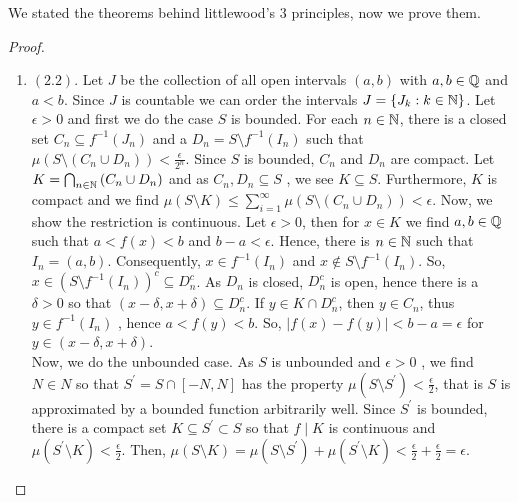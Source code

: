 \begin{recall}
	We stated the theorems behind littlewood's \(3\) principles, now we prove them.
\end{recall}
\begin{proof}
	\begin{enumerate}
		\item \(\left( 2.2 \right) \). Let \(J\) be the collection of all open intervals \(\left( a, b \right) \) with \(a, b \in \mathbb{Q}\)  and \(a < b\). Since \(J\) is countable we can order the intervals \(J = \{J_{k} : k \in \mathbb{N}\} \). Let \(\epsilon > 0\) and first we do the case \(S\) is bounded. For each \(n \in \mathbb{N}\), there is a closed set \(C_{n} \subseteq f^{-1}\left( J_{n} \right) \) and a \(D_{n} = S \setminus f^{-1}\left( I_{n} \right) \) such that \( \mu\left( S \setminus \left( C_{n} \cup D_{n} \right)  \right) < \frac{\epsilon}{2^{n}} \). Since \(S\) is bounded, \(C_{n}\)  and \(D_{n}\) are compact. Let \(K = \bigcap_{n\in \mathbb{N}}\left( C_{n} \cup D_{n} \right)  \) and as \(C_{n}, D_{n} \subseteq S\) , we see \(K \subseteq S\). Furthermore, \(K\) is compact and we find \( \mu\left( S\setminus K \right) \le \sum_{i= 1}^{\infty} \mu\left( S \setminus \left( C_{n} \cup D_{n} \right)  \right) < \epsilon \). Now, we show the restriction is continuous. Let \(\epsilon > 0\), then for \(x \in K\) we find \(a, b \in \mathbb{Q}\) such that \(a < f\left( x \right)  < b\) and \(b - a < \epsilon\). Hence, there is \(n \in \mathbb{N}\) such that \(I_{n} = \left( a, b \right) \). Consequently, \(x \in f^{-1}\left( I_{n} \right) \) and \(x \not\in S \setminus f^{-1}\left( I_{n} \right) \). So, \(x \in \left( S \setminus f^{-1}\left( I_{n} \right)  \right)^{c} \subseteq D_{n}^{c} \). As \(D_{n}\) is closed, \(D_{n}^{c}\) is open, hence there is a \(\delta > 0\) so that \(\left( x - \delta, x + \delta \right) \subseteq D_{n}^{c}\). If \(y \in K \cap D_{n}^{c}\), then \(y \in C_{n}\), thus \(y \in f^{-1}\left( I_{n} \right) \) , hence \(a < f\left( y \right)  < b\). So, \(\left| f\left( x \right)  - f\left( y \right)  \right|  < b-a = \epsilon \) for \(y \in \left( x-\delta, x + \delta \right) \).\\
			Now, we do the unbounded case. As \(S\) is unbounded and \(\epsilon > 0\) , we find \(N \in N\) so that \(S^{\prime} = S \cap \left[ -N, N \right] \)  has the property \( \mu\left( S \setminus S^{\prime} \right) < \frac{\epsilon}{2}\), that is \(S\) is approximated by a bounded function arbitrarily well. Since \(S^{\prime}\) is bounded, there is a compact set \(K \subseteq S^{\prime} \subset S\) so that \(f\mid K\) is continuous and \( \mu\left( S^{\prime} \setminus K \right) < \frac{\epsilon}{2}\). Then, \( \mu\left( S \setminus K \right) = \mu\left( S \setminus S^{\prime} \right)  + \mu\left( S^{\prime} \setminus K \right) < \frac{\epsilon}{2} + \frac{\epsilon}{2} = \epsilon  \).

\end{enumerate}
\end{proof}
